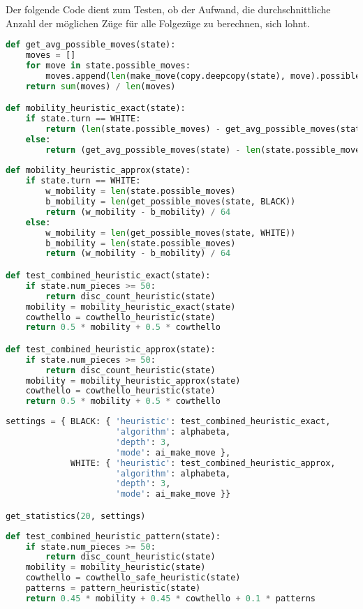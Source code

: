 Der folgende Code dient zum Testen, ob der Aufwand, die
durchschnittliche Anzahl der möglichen Züge für alle Folgezüge zu
berechnen, sich lohnt.

\begin{lstlisting}[language=Python]
def get_avg_possible_moves(state):
    moves = []
    for move in state.possible_moves:
        moves.append(len(make_move(copy.deepcopy(state), move).possible_moves))
    return sum(moves) / len(moves)

def mobility_heuristic_exact(state):
    if state.turn == WHITE:
        return (len(state.possible_moves) - get_avg_possible_moves(state)) / 64
    else:
        return (get_avg_possible_moves(state) - len(state.possible_moves)) / 64
    
def mobility_heuristic_approx(state):
    if state.turn == WHITE:
        w_mobility = len(state.possible_moves)
        b_mobility = len(get_possible_moves(state, BLACK))
        return (w_mobility - b_mobility) / 64
    else:
        w_mobility = len(get_possible_moves(state, WHITE))
        b_mobility = len(state.possible_moves)
        return (w_mobility - b_mobility) / 64

def test_combined_heuristic_exact(state):
    if state.num_pieces >= 50:
        return disc_count_heuristic(state)
    mobility = mobility_heuristic_exact(state)
    cowthello = cowthello_heuristic(state)
    return 0.5 * mobility + 0.5 * cowthello

def test_combined_heuristic_approx(state):
    if state.num_pieces >= 50:
        return disc_count_heuristic(state)
    mobility = mobility_heuristic_approx(state)
    cowthello = cowthello_heuristic(state)
    return 0.5 * mobility + 0.5 * cowthello
\end{lstlisting}

\begin{lstlisting}[language=Python]
settings = { BLACK: { 'heuristic': test_combined_heuristic_exact,
                      'algorithm': alphabeta,
                      'depth': 3,
                      'mode': ai_make_move },
             WHITE: { 'heuristic': test_combined_heuristic_approx,
                      'algorithm': alphabeta,
                      'depth': 3,
                      'mode': ai_make_move }}

get_statistics(20, settings)
\end{lstlisting}

\begin{lstlisting}[language=Python]
def test_combined_heuristic_pattern(state):
    if state.num_pieces >= 50:
        return disc_count_heuristic(state)
    mobility = mobility_heuristic(state)
    cowthello = cowthello_safe_heuristic(state)
    patterns = pattern_heuristic(state)
    return 0.45 * mobility + 0.45 * cowthello + 0.1 * patterns
\end{lstlisting}

